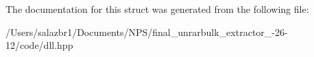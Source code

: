 The documentation for this struct was generated from the following file\-:\begin{DoxyCompactItemize}
\item 
/\-Users/salazbr1/\-Documents/\-N\-P\-S/final\-\_\-unrarbulk\-\_\-extractor\-\_-\/26-\/12/code/dll.\-hpp\end{DoxyCompactItemize}

